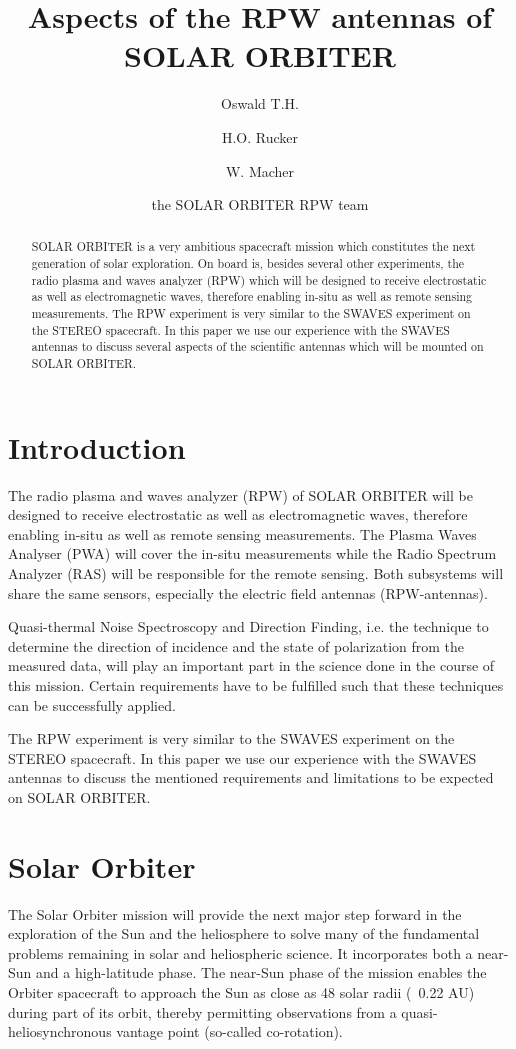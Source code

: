 \documentclass[a4paper,twocolumn]{esapub2005} %
\title{Aspects of the RPW antennas of SOLAR ORBITER}
\author[*]{Oswald T.H.}
\author[*]{H.O. Rucker}
\author[*]{W. Macher}
\affil[*]{Space Research Institute, Austrian Academy of Sciences, A-8042 Graz, Austria, thomas.oswald@oeaw.ac.at}
\author[ ]{the SOLAR ORBITER RPW team}
\begin{document}

\maketitle

\begin{abstract}
SOLAR ORBITER is a very ambitious spacecraft mission which constitutes the next generation of solar exploration. On board is, besides several other experiments, the radio plasma and waves analyzer (RPW) which will be designed to receive electrostatic as well as electromagnetic waves, therefore enabling in-situ as well as remote sensing measurements. The RPW experiment is very similar to the SWAVES experiment on the STEREO spacecraft. In this paper we use our experience with the SWAVES antennas to discuss several aspects of the scientific antennas which will be mounted on SOLAR ORBITER.
\end{abstract}

\section{Introduction}
The radio plasma and waves analyzer (RPW) of SOLAR ORBITER will be designed to receive electrostatic as well as electromagnetic waves, therefore enabling in-situ as well as remote sensing measurements. The Plasma Waves Analyser (PWA) will cover the in-situ measurements while the Radio Spectrum Analyzer (RAS) will be responsible for the remote sensing. Both subsystems will share the same sensors, especially the electric field antennas (RPW-antennas).

Quasi-thermal Noise Spectroscopy and Direction Finding, i.e. the technique to determine the direction of incidence and the state of polarization from the measured data, will play an important part in the science done in the course of this mission. Certain requirements have to be fulfilled such that these techniques can be successfully applied.

The RPW experiment is very similar to the SWAVES experiment on the STEREO spacecraft. In this paper we use our experience with the SWAVES antennas to discuss the mentioned requirements and limitations to be expected on SOLAR ORBITER.

\section{Solar Orbiter}
The Solar Orbiter mission will provide the next major step forward in the exploration of the Sun and the heliosphere to solve many of the fundamental problems remaining in solar and heliospheric science. It incorporates both a near-Sun and a high-latitude phase. The near-Sun phase of the mission enables the Orbiter spacecraft to approach the Sun as close as 48 solar radii (~0.22 AU) during part of its orbit, thereby permitting observations from a quasi-heliosynchronous vantage point (so-called co-rotation).
\end{document}
